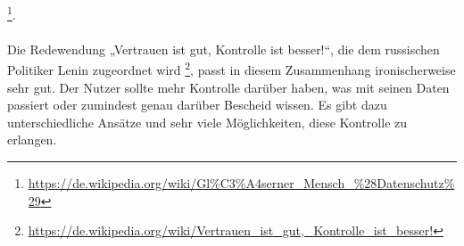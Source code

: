 \footnote{\url{https://de.wikipedia.org/wiki/Gl\%C3\%A4serner_Mensch_\%28Datenschutz\%29}}.
\\
\\
Die Redewendung „Vertrauen ist gut, Kontrolle ist besser!“, die dem russischen Politiker Lenin zugeordnet wird
\footnote{\url{https://de.wikipedia.org/wiki/Vertrauen_ist_gut,_Kontrolle_ist_besser!}}, passt in diesem Zusammenhang ironischerweise sehr gut. Der Nutzer sollte mehr Kontrolle darüber haben, was mit seinen Daten passiert oder zumindest genau darüber Bescheid wissen. Es gibt dazu unterschiedliche Ansätze und sehr viele Möglichkeiten, diese Kontrolle zu erlangen.

